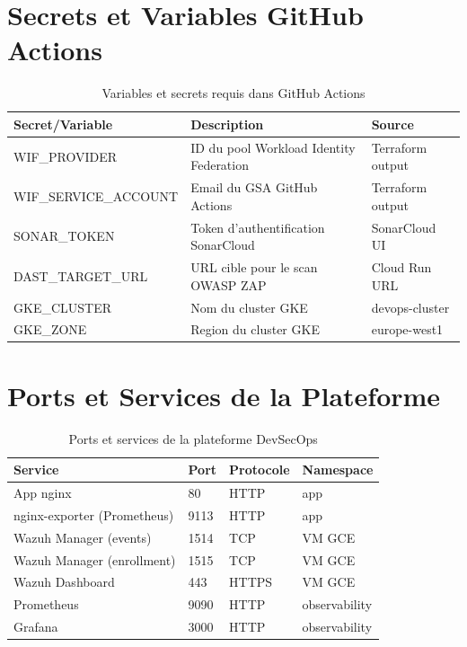 ﻿%
\section{Secrets et Variables GitHub Actions}
\begin{table}[h]
\centering
\caption{Variables et secrets requis dans GitHub Actions}
\begin{tabularx}{\textwidth}{|l|X|l|}
\hline
\rowcolor{gray!20}\textbf{Secret/Variable} & \textbf{Description} & \textbf{Source} \\
\hline
WIF\_PROVIDER & ID du pool Workload Identity Federation & Terraform output \\
\hline
WIF\_SERVICE\_ACCOUNT & Email du GSA GitHub Actions & Terraform output \\
\hline
SONAR\_TOKEN & Token d'authentification SonarCloud & SonarCloud UI \\
\hline
DAST\_TARGET\_URL & URL cible pour le scan OWASP ZAP & Cloud Run URL \\
\hline
GKE\_CLUSTER & Nom du cluster GKE & devops-cluster \\
\hline
GKE\_ZONE & Region du cluster GKE & europe-west1 \\
\hline
\end{tabularx}
\end{table}
\section{Ports et Services de la Plateforme}
\begin{table}[h]
\centering
\caption{Ports et services de la plateforme DevSecOps}
\begin{tabularx}{\textwidth}{|l|l|l|l|}
\hline
\rowcolor{gray!20}\textbf{Service} & \textbf{Port} & \textbf{Protocole} & \textbf{Namespace} \\
\hline
App nginx & 80 & HTTP & app \\
\hline
nginx-exporter (Prometheus) & 9113 & HTTP & app \\
\hline
Wazuh Manager (events) & 1514 & TCP & VM GCE \\
\hline
Wazuh Manager (enrollment) & 1515 & TCP & VM GCE \\
\hline
Wazuh Dashboard & 443 & HTTPS & VM GCE \\
\hline
Prometheus & 9090 & HTTP & observability \\
\hline
Grafana & 3000 & HTTP & observability \\
\hline
\end{tabularx}
\end{table}
